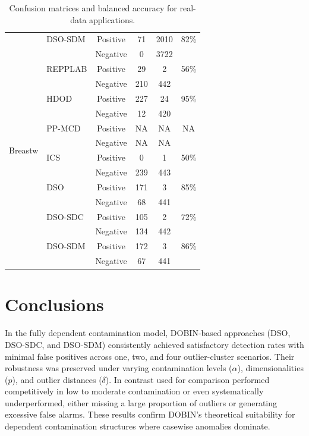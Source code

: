 \documentclass[12pt]{article}
\begin{document}
\begin{table}[!htbp]
\begin{tabular}{llcccc}
 & DSO-SDM  & Positive & 71 & 2010 & 82\% \\
 &          & Negative & 0  & 3722 &      \\
\midrule
\multirow{12}{*}{Breastw}
 & REPPLAB  & Positive & 29 & 2   & 56\% \\
 &          & Negative & 210 & 442 &      \\
 & HDOD     & Positive & 227 & 24  & 95\% \\
 &          & Negative & 12  & 420 &      \\
 & PP-MCD   & Positive & NA  & NA  & NA  \\
 &          & Negative & NA  & NA  &      \\
 & ICS      & Positive & 0   & 1   & 50\% \\
 &          & Negative & 239 & 443 &      \\
 & DSO      & Positive & 171 & 3   & 85\% \\
 &          & Negative & 68  & 441 &      \\
 & DSO-SDC  & Positive & 105 & 2   & 72\% \\
 &          & Negative & 134 & 442 &      \\
 & DSO-SDM  & Positive & 172 & 3   & 86\% \\
 &          & Negative & 67  & 441 &      \\
\bottomrule
\end{tabular}
\caption{Confusion matrices and balanced accuracy for real-data applications.}
\end{table}


\section{Conclusions} \label{sec:con}

In the fully dependent contamination model, DOBIN-based approaches (DSO, DSO-SDC, and DSO-SDM) consistently achieved satisfactory detection rates with minimal false positives across one, two, and four outlier-cluster scenarios. Their robustness was preserved under varying contamination levels ($\alpha$), dimensionalities ($p$), and outlier distances ($\delta$). In contrast used for comparison performed competitively in low to moderate contamination or even systematically underperformed, either missing a large proportion of outliers or generating excessive false alarms. These results confirm DOBIN’s theoretical suitability for dependent contamination structures where casewise anomalies dominate. \\
\end{document}
